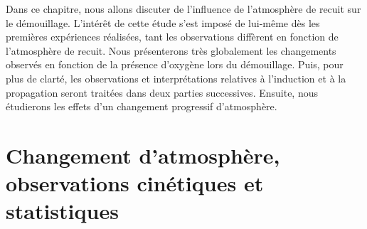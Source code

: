 \minitoc
\newpage

Dans ce chapitre, nous allons discuter de l’influence de l’atmosphère de recuit sur le démouillage. L’intérêt de cette étude s’est imposé de lui-même dès les premières expériences réalisées, tant les observations diffèrent en fonction de l’atmosphère de recuit. Nous présenterons très globalement les changements observés en fonction de la présence d’oxygène lors du démouillage. Puis, pour plus de clarté, les observations et interprétations relatives à l’induction et à la propagation seront traitées dans deux parties successives. Ensuite, nous étudierons les effets d’un changement progressif d’atmosphère.\par 

\section{Changement d’atmosphère, observations cinétiques et statistiques}

